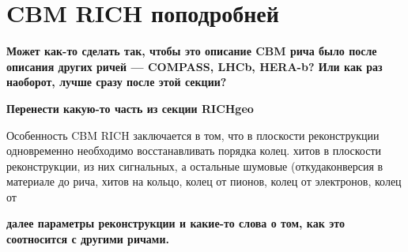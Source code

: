 \section{CBM RICH поподробней}

\todo \textbf{Может как-то сделать так, чтобы это описание CBM рича было после описания других ричей --- COMPASS, LHCb, HERA-b? Или как раз наоборот, лучше сразу после этой секции?}

\todo \textbf{Перенести какую-то часть из секции RICHgeo}

Особенность CBM RICH заключается в том, что в плоскости реконструкции одновременно необходимо восстанавливать порядка \todo колец. 
\todo хитов в плоскости реконструкции, из них \todo сигнальных, а остальные шумовые (откуда\todo  конверсия в материале до рича\todo , \todo хитов на кольцо, \todo колец от пионов, \todo колец от электронов, \todo колец от \todo

\todo \textbf{далее параметры реконструкции и какие-то слова о том, как это соотносится с другими ричами.}
